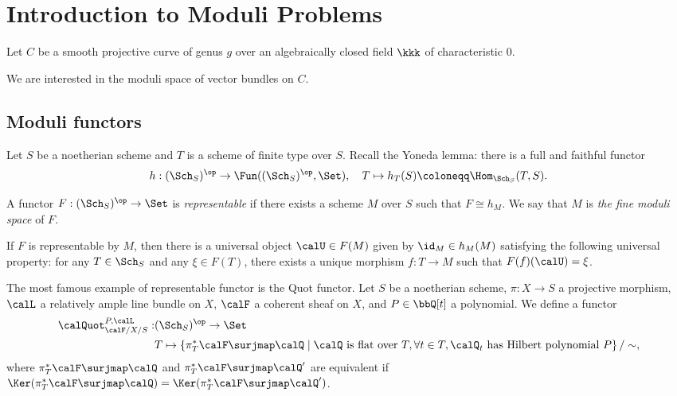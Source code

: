 \section{Introduction to Moduli Problems}

    Let \(C\) be a smooth projective curve of genus \(g\) over an algebraically closed field \(\kkk\) of characteristic \(0\).

    We are interested in the moduli space of vector bundles on \(C\).

\subsection{Moduli functors}

    Let \(S\) be a noetherian scheme and \(T\) is a scheme of finite type over \(S\).
    Recall the Yoneda lemma: 
    there is a full and faithful functor 
    \[ h : (\Sch_S)^{\op} \to \Fun((\Sch_S)^{\op}, \Set), \quad T \mapsto h_T(S) \coloneqq \Hom_{\Sch_S}(T, S). \]
    
    A functor \(F : (\Sch_S)^{\op} \to \Set\) is \emph{representable} if there exists a scheme \(M\) over \(S\) such that \(F \cong h_M\).
    We say that \(M\) is \emph{the fine moduli space} of \(F\).

    \begin{remark}\label{rmk:fine_moduli_space}
        If \(F\) is representable by \(M\), then there is a universal object \(\calU \in F(M)\) given by \(\id_M \in h_M(M)\) satisfying the following universal property: 
        for any \(T \in \Sch_S\) and any \(\xi \in F(T)\), there exists a unique morphism \(f : T \to M\) such that \(F(f)(\calU) = \xi\).
    \end{remark}

    The most famous example of representable functor is the Quot functor.
    Let \(S\) be a noetherian scheme, \(\pi:X \to S\) a projective morphism, \(\calL\) a relatively ample line bundle on \(X\), \(\calF\) a coherent sheaf on \(X\), and \(P \in \bbQ[t]\) a polynomial.
    We define a functor
    \begin{align*}
        \calQuot_{\calF/X/S}^{P,\calL} : & (\Sch_S)^{\op} \to \Set \\
        & T \mapsto 
        \left\{ 
            \pi^*_T \calF \surjmap \calQ 
        \;\middle|\;
            \calQ \text{ is flat over } T, \forall t \in T, \calQ_t \text{ has Hilbert polynomial } P
        \right\}/ \sim,
    \end{align*}
    where \(\pi^*_T \calF \surjmap \calQ\) and \(\pi^*_T \calF \surjmap \calQ'\) are equivalent if \(\Ker(\pi^*_T \calF \surjmap \calQ) = \Ker(\pi^*_T \calF \surjmap \calQ')\).

